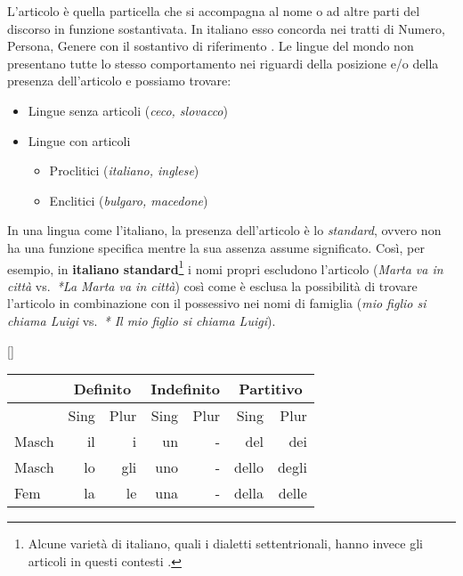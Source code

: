 \documentclass[a4paper,twoside,11pt,chapterprefix=false,bibliography=totocnumbered,listof=flat]{scrbook}
\makeatletter
\providecommand{\tightlist}{%
  \setlength{\itemsep}{0pt}\setlength{\parskip}{0pt}}
\renewenvironment{table}[1][\fps@table]{
  \edef\@tempa{\noexpand\@float{table}[#1]} 
  \@tempa
  \sffamily
  \footnotesize
}{
  \end@float
}
\makeatother
\begin{document}
L'articolo è quella particella che si accompagna al nome o ad altre
parti del discorso in funzione sostantivata. In italiano esso concorda
nei tratti di Numero, Persona, Genere con il sostantivo di riferimento
\citep{grandi2010}. Le lingue del mondo non presentano tutte lo stesso
comportamento nei riguardi della posizione e/o della presenza
dell'articolo e possiamo trovare:

\begin{itemize}
\tightlist
\item
  Lingue senza articoli (\emph{ceco, slovacco})
\item
  Lingue con articoli

  \begin{itemize}
  \tightlist
  \item
    Proclitici (\emph{italiano, inglese})
  \item
    Enclitici (\emph{bulgaro, macedone})
  \end{itemize}
\end{itemize}

In una lingua come l'italiano, la presenza dell'articolo è lo
\emph{standard}, ovvero non ha una funzione specifica mentre la sua
assenza assume significato. Così, per esempio, in \textbf{italiano
standard}\footnote{Alcune varietà di italiano, quali i dialetti
  settentrionali, hanno invece gli articoli in questi contesti
  \citep{loporcaro2009}.} i nomi propri escludono l'articolo
(\emph{Marta va in città} vs.~\emph{*La Marta va in città}) così come è
esclusa la possibilità di trovare l'articolo in combinazione con il
possessivo nei nomi di famiglia (\emph{mio figlio si chiama Luigi}
vs.~\emph{* Il mio figlio si chiama Luigi}).

\begin{table}[]
\begin{tabular}{@{}lrrrrrr@{}}
\toprule
      & \multicolumn{2}{c}{Definito} & \multicolumn{2}{c}{Indefinito} & \multicolumn{2}{c}{Partitivo} \\ \midrule
      & Sing          & Plur         & Sing           & Plur          & Sing          & Plur          \\
Masch & il            & i            & un             & -             & del           & dei           \\
Masch & lo            & gli          & uno            & -             & dello         & degli         \\
Fem   & la            & le           & una            & -             & della         & delle         \\ \bottomrule
\end{tabular}
\caption{Tabella riassuntiva degli articoli in italiano}
\end{table}
\end{document}
